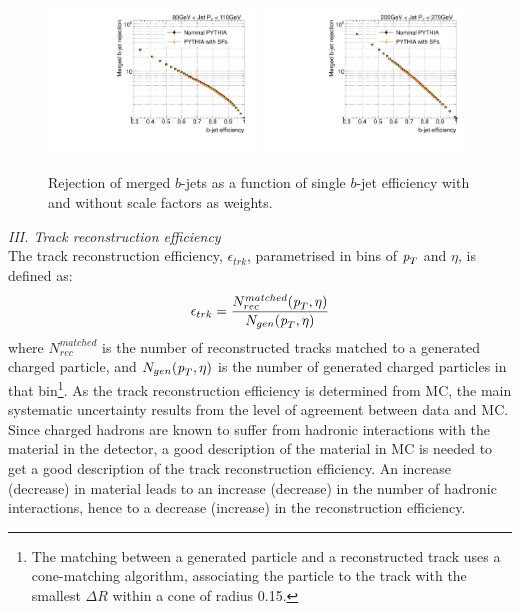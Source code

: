 \begin{figure}[tp]
\centering
\includegraphics[width=0.49\textwidth]{FIGS/systematics/LlhoodKDE_ISO_BTagCalibTest_rejvseff080.pdf}
\includegraphics[width=0.49\textwidth]{FIGS/systematics/LlhoodKDE_ISO_BTagCalibTest_rejvseff200.pdf}
\caption{Rejection of merged $b$-jets as a function of single $b$-jet efficiency with and without scale factors as weights.}
\label{fig:btaggingSFsPerf}
\end{figure}



\vspace{5mm}
{ \em III. Track reconstruction efficiency}
\\[3mm]

The track reconstruction efficiency, $\epsilon_{trk}$, parametrised in bins of ${\emph{p}_{T}}$ and $\eta$, is defined as:
%
\begin{equation}
\epsilon_{trk} = \frac{N^{matched}_{rec}({\emph{p}_{T}},\eta)}{N_{gen}({\emph{p}_{T}},\eta)}
\end{equation}
%
where $N^{matched}_{rec}$ is the number of reconstructed tracks matched to a generated charged particle, and $N_{gen}({\emph{p}_{T}},\eta)$ is the number of generated charged particles in that bin\footnote{The matching between a generated particle and a reconstructed track uses a cone-matching algorithm, associating the particle to the track with the smallest $\Delta R$ within a cone of radius 0.15.}.  As the track reconstruction efficiency is determined from MC, the main systematic uncertainty results from the level of agreement between data and MC.  Since charged hadrons are known to suffer from hadronic interactions with the material in the detector, a good description of the material in MC is needed to get a good description of the track reconstruction efficiency.  
An increase (decrease) in material leads to an increase (decrease) in the number of hadronic interactions, hence to a decrease (increase) in the reconstruction efficiency. 


